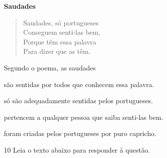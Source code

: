 \begin{myquote}




\textbf{Saudades}

\begin{verse}

Saudades, só portugueses \\
Conseguem senti-las bem, \\
Porque têm essa palavra \\
Para dizer que as têm.

\end{verse}


\end{myquote}

Segundo o poema, as saudades  

\begin{escolha}

  \item são sentidas por todos que conhecem essa palavra.
  
  \item só são adequadamente sentidas pelos portugueses.
  
  \item pertencem a qualquer pessoa que saiba senti-las bem.
  
  \item foram criadas pelos portugueses por puro capricho.

\end{escolha}

\num{10} Leia o texto abaixo para responder à questão. 

